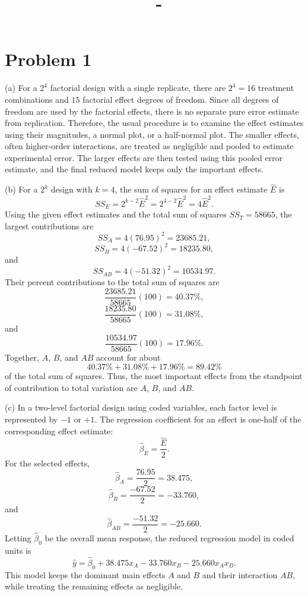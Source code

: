 \documentclass[answers,12pt,addpoints]{exam}
\author{\name}
\title{\course \ - \assignment}
\begin{document}
\maketitle
\tableofcontents

\newpage


\section{Problem 1}

\begin{solution}
(a) For a $2^4$ factorial design with a single replicate, there are $2^4=16$ treatment combinations and $15$ factorial effect degrees of freedom. Since all degrees of freedom are used by the factorial effects, there is no separate pure error estimate from replication. Therefore, the usual procedure is to examine the effect estimates using their magnitudes, a normal plot, or a half-normal plot. The smaller effects, often higher-order interactions, are treated as negligible and pooled to estimate experimental error. The larger effects are then tested using this pooled error estimate, and the final reduced model keeps only the important effects.

(b) For a $2^k$ design with $k=4$, the sum of squares for an effect estimate $\hat{E}$ is
\[
SS_E = 2^{k-2}\hat{E}^2 = 2^{4-2}\hat{E}^2 = 4\hat{E}^2.
\]
Using the given effect estimates and the total sum of squares $SS_T=58665$, the largest contributions are
\[
SS_A = 4(76.95)^2 = 23685.21,
\]
\[
SS_B = 4(-67.52)^2 = 18235.80,
\]
and
\[
SS_{AB} = 4(-51.32)^2 = 10534.97.
\]
Their percent contributions to the total sum of squares are
\[
\frac{23685.21}{58665}(100) = 40.37\%,
\]
\[
\frac{18235.80}{58665}(100) = 31.08\%,
\]
and
\[
\frac{10534.97}{58665}(100) = 17.96\%.
\]
Together, $A$, $B$, and $AB$ account for about
\[
40.37\%+31.08\%+17.96\%=89.42\%
\]
of the total sum of squares. Thus, the most important effects from the standpoint of contribution to total variation are $A$, $B$, and $AB$.

(c) In a two-level factorial design using coded variables, each factor level is represented by $-1$ or $+1$. The regression coefficient for an effect is one-half of the corresponding effect estimate:
\[
\hat{\beta}_E=\frac{\hat{E}}{2}.
\]
For the selected effects,
\[
\hat{\beta}_A=\frac{76.95}{2}=38.475,
\]
\[
\hat{\beta}_B=\frac{-67.52}{2}=-33.760,
\]
and
\[
\hat{\beta}_{AB}=\frac{-51.32}{2}=-25.660.
\]
Letting $\hat{\beta}_0$ be the overall mean response, the reduced regression model in coded units is
\[
\hat{y}
=
\hat{\beta}_0
+
38.475x_A
-
33.760x_B
-
25.660x_Ax_B.
\]
This model keeps the dominant main effects $A$ and $B$ and their interaction $AB$, while treating the remaining effects as negligible.
\end{solution}
\end{document}
